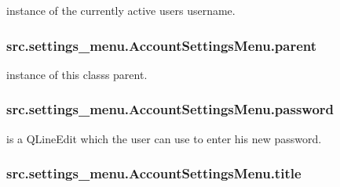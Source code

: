 instance of the currently active user\textquotesingle{}s username. 

\hypertarget{classsrc_1_1settings__menu_1_1_account_settings_menu_afe50b3829d1054937762620263272c4b}{}
\subsubsection[{parent}]{\setlength{\rightskip}{0pt plus 5cm}src.\+settings\+\_\+menu.\+Account\+Settings\+Menu.\+parent}\label{classsrc_1_1settings__menu_1_1_account_settings_menu_afe50b3829d1054937762620263272c4b}


instance of this class\textquotesingle{}s parent. 

\hypertarget{classsrc_1_1settings__menu_1_1_account_settings_menu_a11ded2b607c6b7e0b756eef17952b1f6}{}
\subsubsection[{password}]{\setlength{\rightskip}{0pt plus 5cm}src.\+settings\+\_\+menu.\+Account\+Settings\+Menu.\+password}\label{classsrc_1_1settings__menu_1_1_account_settings_menu_a11ded2b607c6b7e0b756eef17952b1f6}


is a Q\+Line\+Edit which the user can use to enter his new password. 

\hypertarget{classsrc_1_1settings__menu_1_1_account_settings_menu_a6f5f05b647982a9776c96ea5ca254068}{}
\subsubsection[{title}]{\setlength{\rightskip}{0pt plus 5cm}src.\+settings\+\_\+menu.\+Account\+Settings\+Menu.\+title}\label{classsrc_1_1settings__menu_1_1_account_settings_menu_a6f5f05b647982a9776c96ea5ca254068}


